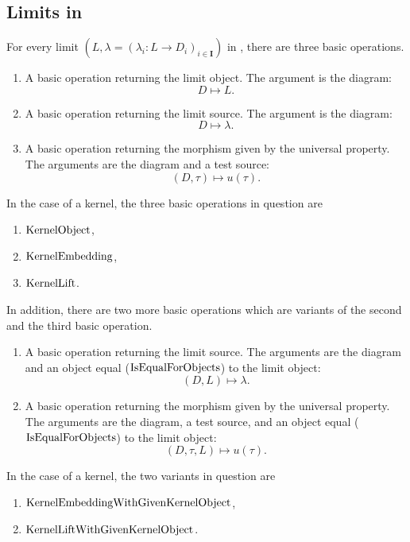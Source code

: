 \subsection{Limits in \CapPkg}

For every limit $\left(L, \lambda = ( \lambda_i: L \rightarrow D_i)_{i \in \mathbf{I}} \right)$ in \CapPkg, 
there are three basic operations.

\begin{enumerate}
 \item A basic operation returning the limit object. The argument is the diagram:
 \[
  D \mapsto L.
 \]
 \item A basic operation returning the limit source. The argument is the diagram:
 \[
  D \mapsto \lambda.
 \]
 \item A basic operation returning the morphism given by the universal property. 
       The arguments are the diagram and a test source:
 \[
  ( D, \tau ) \mapsto u(\tau).
 \]
\end{enumerate}

\begin{example}
 In the case of a kernel, the three basic operations in question are
 \begin{enumerate}
  \item $\mathrm{KernelObject}$,
  \item $\mathrm{KernelEmbedding}$,
  \item $\mathrm{KernelLift}$.
 \end{enumerate} 
\end{example}

In addition, there are two more basic operations which are variants of the second
and the third basic operation.

\begin{enumerate}
 \item A basic operation returning the limit source. The arguments are the diagram
       and an object equal ($\mathrm{IsEqualForObjects}$) to the limit object:
       \[
        ( D, L ) \mapsto \lambda.
       \]
  \item A basic operation returning the morphism given by the universal property.
        The arguments are the diagram, a test source, and an object equal ($\mathrm{IsEqualForObjects}$)
        to the limit object:
        \[
         ( D, \tau, L ) \mapsto u( \tau ).
        \]
\end{enumerate}

\begin{example}
 In the case of a kernel, the two variants in question are
 \begin{enumerate}
  \item $\mathrm{KernelEmbeddingWithGivenKernelObject}$,
  \item $\mathrm{KernelLiftWithGivenKernelObject}$.
 \end{enumerate} 
\end{example}

